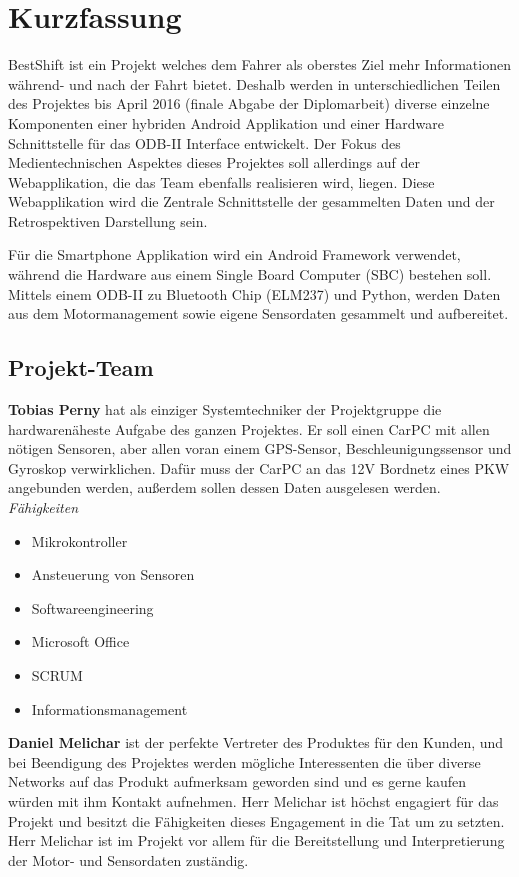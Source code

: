 \chapter{Kurzfassung}
BestShift ist ein Projekt welches dem Fahrer als oberstes Ziel mehr Informationen während- und nach der Fahrt bietet. 
Deshalb werden in unterschiedlichen Teilen des Projektes bis April 2016 (finale Abgabe der Diplomarbeit) 
diverse einzelne Komponenten einer hybriden Android Applikation und einer Hardware Schnittstelle für das ODB-II 
Interface entwickelt. Der Fokus des Medientechnischen Aspektes dieses Projektes soll allerdings auf der Webapplikation,
die das Team ebenfalls realisieren wird, liegen. Diese Webapplikation wird die Zentrale Schnittstelle der gesammelten Daten
und der Retrospektiven Darstellung sein. 

Für die Smartphone Applikation wird ein Android Framework verwendet, 
während die Hardware aus einem Single Board Computer (SBC) bestehen soll. 
Mittels einem ODB-II zu Bluetooth Chip (ELM237) und Python, 
werden Daten aus dem Motormanagement sowie eigene Sensordaten gesammelt und aufbereitet. 

\newpage
\section{Projekt-Team}
\textbf{Tobias Perny} hat als einziger Systemtechniker der Projektgruppe die hardwarenäheste Aufgabe des ganzen Projektes. Er soll einen CarPC mit allen nötigen Sensoren, aber allen voran einem GPS-Sensor, Beschleunigungssensor und Gyroskop verwirklichen. Dafür muss der CarPC an das 12V Bordnetz eines PKW angebunden werden, außerdem sollen dessen Daten ausgelesen werden.
\nextline 
\textit{Fähigkeiten}
\begin{itemize}
	\item Mikrokontroller
	\item Ansteuerung von Sensoren		
	\item Softwareengineering
	\item Microsoft Office
	\item SCRUM
	\item Informationsmanagement
\end{itemize}

\nextline

\textbf{Daniel Melichar} ist der perfekte Vertreter des Produktes für den Kunden, und bei Beendigung des Projektes werden mögliche Interessenten die über diverse Networks auf das Produkt aufmerksam geworden sind und es gerne kaufen würden mit ihm Kontakt aufnehmen. Herr Melichar ist höchst engagiert für das Projekt und besitzt die Fähigkeiten dieses Engagement in die Tat um zu setzten. Herr Melichar ist im Projekt vor allem für die Bereitstellung und Interpretierung der Motor- und Sensordaten zuständig. 

